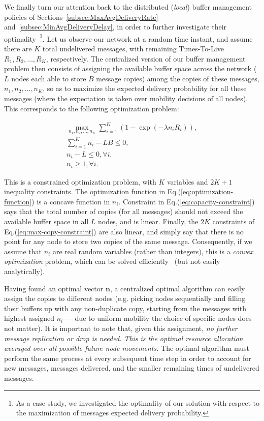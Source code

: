 We finally turn our attention back to the distributed (\emph{local}) buffer management policies of Sections~\ref{subsec:MaxAvgDeliveryRate} and~\ref{subsec:MinAvgDeliveryDelay}, in order to further investigate their optimality~\footnote{As a case study, we investigated the optimality of our solution with respect to the maximization of messages expected delivery probability.}. Let us observe our network at a random time instant, and assume there are $K$ total undelivered messages, with remaining Times-To-Live $R_{1}, R_{2}, \dots, R_{K}$, respectively. The centralized version of our buffer management problem then consists of assigning the available buffer space across the network ($L$ nodes each able to store $B$ message copies) among the copies of these messages, $n_{1}, n_{2}, \dots, n_{K}$, so as to maximize the expected delivery probability for all these messages (where the expectation is taken over mobility decisions of all nodes). This corresponds to the following optimization problem:

\begin{eqnarray}
\underset{n_{1},n_{2},\dots,n_{K}}{\max} \sum_{i=1}^{K} (1-\exp(-\lambda n_i R_i)) \label{eq:optimization-function}, \\
\sum_{i=1}^{K} n_{i} - L B \le 0 \label{eq:capacity-constraint}, \\
n_{i} - L  \le 0, \forall i \label{eq:max-copy-constraint}, \\
n_{i} \geq 1, \forall i \label{eq:min-copy-constraint}.
\end{eqnarray}

This is a constrained optimization problem, with $K$ variables and $2K+1$ inequality constraints. The optimization function in Eq.(\ref{eq:optimization-function}) is a concave function in $n_{i}$. Constraint in Eq.(\ref{eq:capacity-constraint}) says that the total number of copies (for all messages) should not exceed the available buffer space in all $L$ nodes, and is linear. Finally, the $2K$ constraints of Eq.(\ref{eq:max-copy-constraint}) are also linear, and simply say that there is no point for any node to store two copies of the same message. Consequently, if we assume that $n_{i}$ are real random variables (rather than integers), this is a \emph{convex optimization} problem, which can be solved efficiently~\cite{Boyd:convex-optimization-book} (but not easily analytically).

Having found an optimal vector $\mathbf{n}$, a centralized optimal algorithm can easily assign the copies to different nodes (e.g. picking nodes sequentially and filling their buffers up with any non-duplicate copy, starting from the messages with highest assigned $n_{i}$ --- due to uniform mobility the choice of specific nodes does not matter). It is important to note that, given this assignment, \emph{no further message replication or drop is needed. This is the optimal resource allocation averaged over all possible future node movements.} The optimal algorithm must perform the same process at every subsequent time step in order to account for new messages, messages delivered, and the smaller remaining times of undelivered messages.

